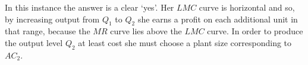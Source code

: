 

In this instance the answer is a clear `yes'. Her $LMC$ curve is horizontal and so, by increasing output from $Q_1$ to $Q_2$ she earns a profit on each additional unit in that range, because the $MR$ curve lies above the $LMC$ curve.  In order to produce the output level $Q_2$ at least cost she must choose a plant size corresponding to $AC_2$. 